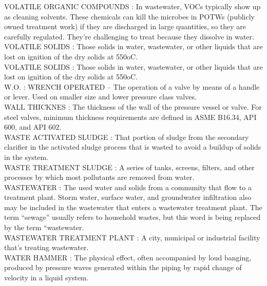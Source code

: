 \vspace{0.15cm}
VOLATILE ORGANIC COMPOUNDS :   In wastewater, VOCs typically show up as cleaning solvents. These chemicals can kill the microbes in POTWs (publicly owned treatment work) if they are discharged in large quantities, so they are carefully regulated. They’re challenging to treat because they dissolve in water.\\
\vspace{0.15cm}
VOLATILE SOLIDS :  Those solids in water, wastewater, or other liquids that are lost on ignition of the dry solids at 550oC.\\
\vspace{0.15cm}
VOLATILE SOLIDS :  Those solids in water, wastewater, or other liquids that are lost on ignition of the dry solids at 550oC.\\
\vspace{0.15cm}
W.O. :  WRENCH OPERATED –  The operation of a valve by means of a handle or lever. Used on smaller size and lower pressure class valves.\\
\vspace{0.15cm}
WALL THICKNES :   The thickness of the wall of the pressure vessel or valve. For steel valves, minimum thickness requirements are defined in ASME B16.34, API 600, and API 602.\\
\vspace{0.15cm}
WASTE ACTIVATED SLUDGE :   That portion of sludge from the secondary clarifier in the activated sludge process that is wasted to avoid a buildup of solids in the system.\\
\vspace{0.15cm}
WASTE TREATMENT SLUDGE :   A series of tanks, screens, filters, and other processes by which most pollutants are removed from water.\\
\vspace{0.15cm}
WASTEWATER :  The used water and solids from a community that flow to a treatment plant. Storm water, surface water, and groundwater infiltration also may be included in the wastewater that enters a wastewater treatment plant. The term “sewage” usually refers to household wastes, but this word is being replaced by the term “wastewater.\\
\vspace{0.15cm}
WASTEWATER TREATMENT PLANT :   A city, municipal or industrial facility that’s treating wastewater.\\
\vspace{0.15cm}
WATER HAMMER :   The physical effect, often accompanied by loud banging, produced by pressure waves generated within the piping by rapid change of velocity in a liquid system.\\
